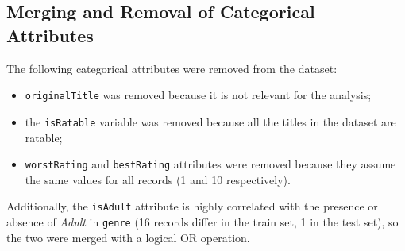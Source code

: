     
    


\subsection{Merging and Removal of Categorical Attributes}\label{subsec:var_elim_discrete}
The following categorical attributes were removed from the dataset:
\begin{itemize}
    \item \texttt{originalTitle} was removed because it is not relevant for the analysis;
    \item the \texttt{isRatable} variable was removed because all the titles in the dataset are ratable;
    \item \texttt{worstRating} and \texttt{bestRating} attributes were removed because they assume the same values for all records (1 and 10 respectively).
\end{itemize}

Additionally, the \texttt{isAdult} attribute is highly correlated with the presence or absence of
\textit{Adult} in \texttt{genre} (16 records differ in the train set, 1 in the test set), so the two were
merged with a logical OR operation.


